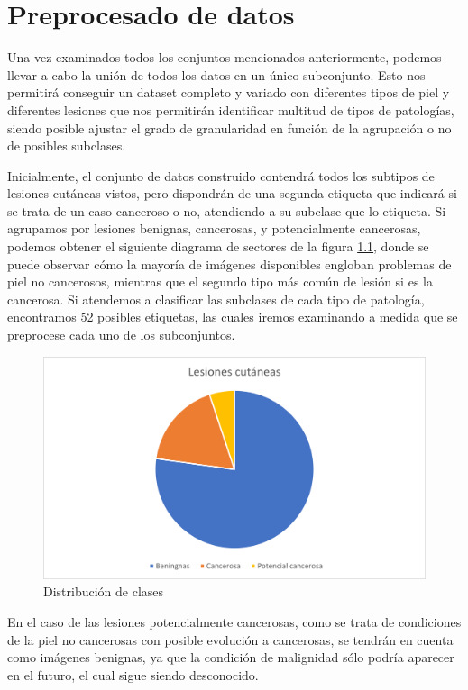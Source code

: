 \chapter{Preprocesado de datos}


Una vez examinados todos los conjuntos mencionados anteriormente, podemos llevar a cabo la unión de todos los datos en un único subconjunto. Esto nos permitirá conseguir un dataset completo y variado con diferentes tipos de piel y diferentes lesiones que nos permitirán identificar multitud de tipos de patologías, siendo posible ajustar el grado de granularidad en función de la agrupación o no de posibles subclases.

Inicialmente, el conjunto de datos construido contendrá todos los subtipos de lesiones cutáneas vistos, pero dispondrán de una segunda etiqueta que indicará si se trata de un caso canceroso o no, atendiendo a su subclase que lo etiqueta. Si agrupamos por lesiones benignas, cancerosas, y potencialmente cancerosas, podemos obtener el siguiente diagrama de sectores de la figura \ref{tartabinaria}, donde se puede observar cómo la mayoría de imágenes disponibles engloban problemas de piel no cancerosos, mientras que el segundo tipo más común de lesión si es la cancerosa. Si atendemos a clasificar las subclases de cada tipo de patología, encontramos 52 posibles etiquetas, las cuales iremos examinando a medida que se preprocese cada uno de los subconjuntos.


\begin{figure}[H]
	\centering
	\label {tartabinaria}
	\includegraphics[scale = 0.7]{imagenes/datasetfinal.png}
	\caption{Distribución de clases}
\end{figure}

En el caso de las lesiones potencialmente cancerosas, como se trata de condiciones de la piel no cancerosas con posible evolución a cancerosas, se tendrán en cuenta como imágenes benignas, ya que la condición de malignidad sólo podría aparecer en el futuro, el cual sigue siendo desconocido.


 


